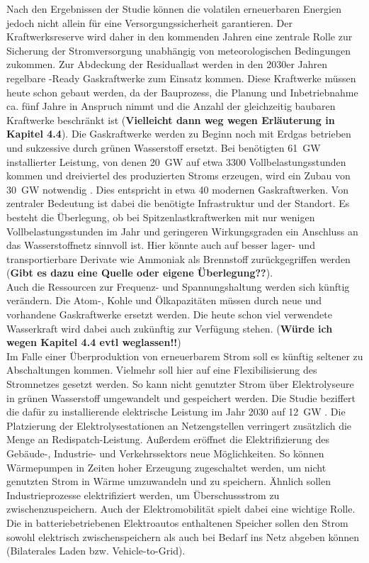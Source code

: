 		Nach den Ergebnissen der Studie können die volatilen erneuerbaren Energien jedoch nicht allein für eine Versorgungssicherheit garantieren. 
		Der Kraftwerksreserve wird daher in den kommenden Jahren eine zentrale Rolle zur Sicherung der Stromversorgung unabhängig von meteorologischen Bedingungen zukommen. 
		Zur Abdeckung der Residuallast werden in den 2030er Jahren regelbare \Htwo-Ready Gaskraftwerke zum Einsatz kommen. 
		Diese Kraftwerke müssen heute schon gebaut werden, da der Bauprozess, die Planung und Inbetriebnahme ca. fünf Jahre in Anspruch nimmt und die Anzahl der gleichzeitig baubaren Kraftwerke beschränkt ist (\textbf{Vielleicht dann weg wegen Erläuterung in Kapitel 4.4}). 		 
		Die Gaskraftwerke werden zu Beginn noch mit Erdgas betrieben und sukzessive durch grünen Wasserstoff ersetzt. 
		Bei benötigten \SI{61}{\giga\watt} installierter Leistung, von denen \SI{20}{\giga\watt} auf etwa 3300 Vollbelastungsstunden kommen und dreiviertel des produzierten Stroms erzeugen, wird ein Zubau von \SI{30}{\giga\watt} notwendig \cite[S.9]{Agora_KlimaneutralesStromsystem}.  
		Dies entspricht in etwa 40 modernen Gaskraftwerken. 
		Von zentraler Bedeutung ist dabei die benötigte Infrastruktur und der Standort. 
		Es besteht die Überlegung, ob bei Spitzenlastkraftwerken mit nur wenigen Vollbelastungsstunden im Jahr und geringeren Wirkungsgraden ein Anschluss an das Wasserstoffnetz sinnvoll ist.
		Hier könnte auch auf besser lager- und transportierbare Derivate wie Ammoniak als Brennstoff zurückgegriffen werden (\textbf{Gibt es dazu eine Quelle oder eigene Überlegung??}). \\
		
		Auch die Ressourcen zur Frequenz- und Spannungshaltung werden sich künftig verändern. 
		Die Atom-, Kohle und Ölkapazitäten müssen durch neue und vorhandene Gaskraftwerke ersetzt werden. 
		Die heute schon viel verwendete Wasserkraft wird dabei auch zukünftig zur Verfügung stehen. (\textbf{Würde ich wegen Kapitel 4.4 evtl weglassen!!}) \\
		
		Im Falle einer Überproduktion von erneuerbarem Strom soll es künftig seltener zu Abschaltungen kommen. 
		Vielmehr soll hier auf eine Flexibilisierung des Stromnetzes gesetzt werden.
		So kann nicht genutzter Strom über Elektrolyseure in grünen Wasserstoff umgewandelt und gespeichert werden. 
		Die Studie beziffert die dafür zu installierende elektrische Leistung im Jahr 2030 auf \SI{12}{\giga\watt} \cite[S.11]{Agora_KlimaneutralesStromsystem}.
		Die Platzierung der Elektrolysestationen an Netzengstellen verringert zusätzlich die Menge an Redispatch-Leistung. 
		Außerdem eröffnet die Elektrifizierung des Gebäude-, Industrie- und Verkehrssektors neue Möglichkeiten. 
		So können Wärmepumpen in Zeiten hoher Erzeugung zugeschaltet werden, um nicht genutzten Strom in Wärme umzuwandeln und zu speichern. 
		Ähnlich sollen Industrieprozesse elektrifiziert werden, um Überschussstrom zu zwischenzuspeichern. 
		Auch der Elektromobilität spielt dabei eine wichtige Rolle. 
		Die in batteriebetriebenen Elektroautos enthaltenen Speicher sollen den Strom sowohl elektrisch zwischenspeichern als auch bei Bedarf ins Netz abgeben können (Bilaterales Laden bzw. Vehicle-to-Grid). 
		
